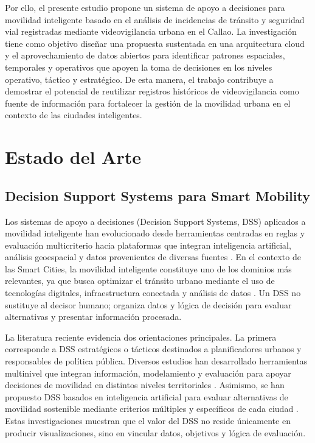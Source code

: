 \documentclass[]{IEEEphot}
\begin{document}
Por ello, el presente estudio propone un sistema de apoyo a decisiones para movilidad inteligente basado en el análisis de incidencias de tránsito y seguridad vial registradas mediante videovigilancia urbana en el Callao. La investigación tiene como objetivo diseñar una propuesta sustentada en una arquitectura cloud y el aprovechamiento de datos abiertos para identificar patrones espaciales, temporales y operativos que apoyen la toma de decisiones en los niveles operativo, táctico y estratégico. De esta manera, el trabajo contribuye a demostrar el potencial de reutilizar registros históricos de videovigilancia como fuente de información para fortalecer la gestión de la movilidad urbana en el contexto de las ciudades inteligentes.

\section{Estado del Arte}

\subsection{Decision Support Systems para Smart Mobility}

Los sistemas de apoyo a decisiones (Decision Support Systems, DSS) aplicados a movilidad inteligente han evolucionado desde herramientas centradas en reglas y evaluación multicriterio hacia plataformas que integran inteligencia artificial, análisis geoespacial y datos provenientes de diversas fuentes \cite{maldonado2020smart,de2021overview,salanova2022multilevel,shulajkovska2024artificial}. En el contexto de las Smart Cities, la movilidad inteligente constituye uno de los dominios más relevantes, ya que busca optimizar el tránsito urbano mediante el uso de tecnologías digitales, infraestructura conectada y análisis de datos \cite{mishra2025internet}. Un DSS no sustituye al decisor humano; organiza datos y lógica de decisión para evaluar alternativas y presentar información procesada.

La literatura reciente evidencia dos orientaciones principales. La primera corresponde a DSS estratégicos o tácticos destinados a planificadores urbanos y responsables de política pública. Diversos estudios han desarrollado herramientas multinivel que integran información, modelamiento y evaluación para apoyar decisiones de movilidad en distintos niveles territoriales \cite{salanova2022multilevel}. Asimismo, se han propuesto DSS basados en inteligencia artificial para evaluar alternativas de movilidad sostenible mediante criterios múltiples y específicos de cada ciudad \cite{shulajkovska2024artificial}. Estas investigaciones muestran que el valor del DSS no reside únicamente en producir visualizaciones, sino en vincular datos, objetivos y lógica de evaluación.
\end{document}
